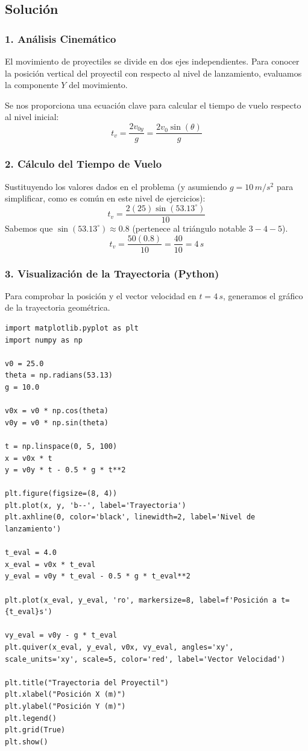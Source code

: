 \documentclass[12pt, a4paper]{article}
\begin{document}
\subsection*{Solución}

\subsubsection*{1. Análisis Cinemático}
El movimiento de proyectiles se divide en dos ejes independientes. Para conocer la posición vertical del proyectil con respecto al nivel de lanzamiento, evaluamos la componente $Y$ del movimiento.

Se nos proporciona una ecuación clave para calcular el tiempo de vuelo respecto al nivel inicial:
$$ t_v = \frac{2v_{0y}}{g} = \frac{2 v_0 \sin(\theta)}{g} $$

\subsubsection*{2. Cálculo del Tiempo de Vuelo}
Sustituyendo los valores dados en el problema (y asumiendo $g = 10 \, \si{m/s^2}$ para simplificar, como es común en este nivel de ejercicios):
$$ t_v = \frac{2(25) \sin(53.13^\circ)}{10} $$
Sabemos que $\sin(53.13^\circ) \approx 0.8$ (pertenece al triángulo notable $3-4-5$).
$$ t_v = \frac{50 (0.8)}{10} = \frac{40}{10} = 4 \, \si{s} $$

\subsubsection*{3. Visualización de la Trayectoria (Python)}
Para comprobar la posición y el vector velocidad en $t=4 \, \si{s}$, generamos el gráfico de la trayectoria geométrica.

\begin{lstlisting}
import matplotlib.pyplot as plt
import numpy as np

v0 = 25.0
theta = np.radians(53.13)
g = 10.0

v0x = v0 * np.cos(theta)
v0y = v0 * np.sin(theta)

t = np.linspace(0, 5, 100)
x = v0x * t
y = v0y * t - 0.5 * g * t**2

plt.figure(figsize=(8, 4))
plt.plot(x, y, 'b--', label='Trayectoria')
plt.axhline(0, color='black', linewidth=2, label='Nivel de lanzamiento')

t_eval = 4.0
x_eval = v0x * t_eval
y_eval = v0y * t_eval - 0.5 * g * t_eval**2

plt.plot(x_eval, y_eval, 'ro', markersize=8, label=f'Posición a t={t_eval}s')

vy_eval = v0y - g * t_eval
plt.quiver(x_eval, y_eval, v0x, vy_eval, angles='xy', scale_units='xy', scale=5, color='red', label='Vector Velocidad')

plt.title("Trayectoria del Proyectil")
plt.xlabel("Posición X (m)")
plt.ylabel("Posición Y (m)")
plt.legend()
plt.grid(True)
plt.show()
\end{lstlisting}
\end{document}
